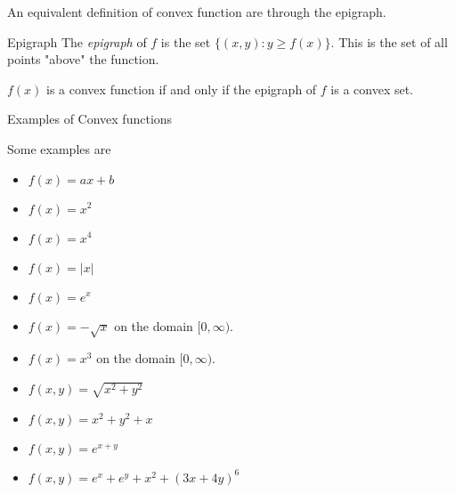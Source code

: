 An equivalent definition of convex function are through the epigraph.

\begin{definition}{Epigraph}{}
The \emph{epigraph} of $f$ is the set $\{(x,y) : y \geq f(x)\}$.  This is the set of all points "above" the function.
\end{definition}

\begin{theorem}{}{}
$f(x)$ is a convex function if and only if the epigraph of $f$ is a convex set.
\end{theorem}

\footnotemark




\begin{example}{Examples of Convex functions}{}

Some examples are 

\begin{itemize}
\item $f(x) = ax + b$
\item $f(x) = x^2$
\item $f(x) = x^4$
\item $f(x) = |x|$
\item $f(x) = e^x$
\item $f(x) = - \sqrt{x}$ on the domain $[0,\infty)$.
\item $f(x) = x^3$ on the domain $[0,\infty)$.
\item $f(x,y) = 
\sqrt{x^2 + y^2}$
\item $f(x,y) = x^2 + y^2 + x$
\item $ f(x,y) = e^{x+y}$
\item $f(x,y) = e^{x} + e^{y} + x^2+  (3x + 4y)^6$
\end{itemize}

\end{example}






